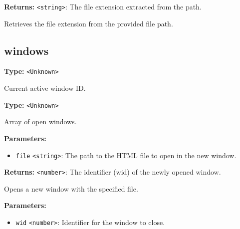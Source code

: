 \documentclass[12pt,a4paper]{article}
\begin{document}
\noindent \textbf{Returns:} \texttt{<string>}: The file extension extracted from the path.

\noindent Retrieves the file extension from the provided file path.


\subsection{windows}
\vspace{5mm}
\noindent {}\vspace{4mm}


\noindent \textbf{Type:} \texttt{<Unknown>}

\noindent Current active window ID.

\vspace{5mm}
\noindent {}\vspace{4mm}


\noindent \textbf{Type:} \texttt{<Unknown>}

\noindent Array of open windows.

\vspace{5mm}
\noindent {}


\noindent \textbf{Parameters:}
\begin{itemize}
  \item \texttt{file} \texttt{<string>}: The path to the HTML file to open in the new window.
\end{itemize}

\noindent \textbf{Returns:} \texttt{<number>}: The identifier (wid) of the newly opened window.

\noindent Opens a new window with the specified file.

\vspace{5mm}
\noindent {}


\noindent \textbf{Parameters:}
\begin{itemize}
  \item \texttt{wid} \texttt{<number>}: Identifier for the window to close.
\end{itemize}
\end{document}
